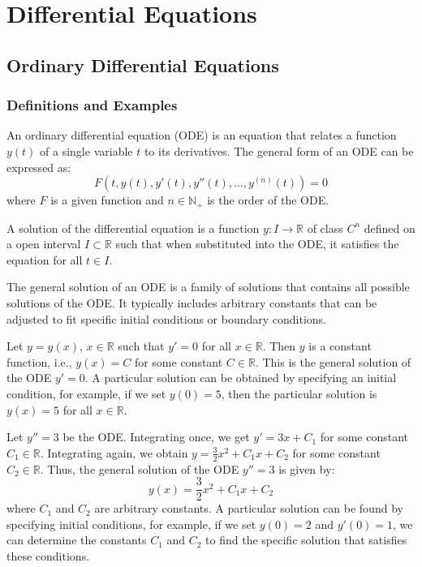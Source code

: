 \chapter{Differential Equations}

\section{Ordinary Differential Equations}
\subsection{Definitions and Examples}
\begin{definition}
    An ordinary differential equation (ODE) is an equation that relates a function \( y(t) \) of a single variable \( t \) to its derivatives. The general form of an ODE can be expressed as:
    \[
    F\left(t, y(t), y'(t), y''(t), \ldots, y^{(n)}(t)\right) = 0
    \]
    where \( F \) is a given function and \( n \in \mathbb{N}_+ \) is the order of the ODE.
\end{definition}

\begin{definition}
    A solution of the differential equation is a function $y: I \to \mathbb{R}$ of class $C^n$ defined on a open interval $I \subset \mathbb{R}$ such that when substituted into the ODE, it satisfies the equation for all $t \in I$.
\end{definition}

\begin{definition}
    The general solution of an ODE is a family of solutions that contains all possible solutions of the ODE. It typically includes arbitrary constants that can be adjusted to fit specific initial conditions or boundary conditions.
\end{definition}

\begin{eg}
    Let $y = y(x)$, $x \in \mathbb{R}$ such that $y' = 0$ for all $x \in \mathbb{R}$. Then $y$ is a constant function, i.e., $y(x) = C$ for some constant $C \in \mathbb{R}$. This is the general solution of the ODE $y' = 0$. A particular solution can be obtained by specifying an initial condition, for example, if we set $y(0) = 5$, then the particular solution is $y(x) = 5$ for all $x \in \mathbb{R}$.
\end{eg}

\begin{eg}
    Let $y'' = 3$ be the ODE. Integrating once, we get $y' = 3x + C_1$ for some constant $C_1 \in \mathbb{R}$. Integrating again, we obtain $y = \frac{3}{2}x^2 + C_1 x + C_2$ for some constant $C_2 \in \mathbb{R}$. Thus, the general solution of the ODE $y'' = 3$ is given by:
    \[
        y(x) = \frac{3}{2}x^2 + C_1 x + C_2
    \]
    where $C_1$ and $C_2$ are arbitrary constants. A particular solution can be found by specifying initial conditions, for example, if we set $y(0) = 2$ and $y'(0) = 1$, we can determine the constants $C_1$ and $C_2$ to find the specific solution that satisfies these conditions.
\end{eg}

